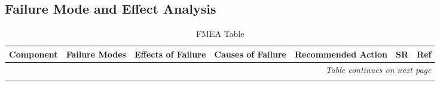 \documentclass{article}
\begin{document}
\begin{landscape}

    \section{Failure Mode and Effect Analysis}
    \centering
    \renewcommand{\arraystretch}{1.5}
    \setlength\LTleft{0pt}
    \setlength\LTright{0pt}
    \begin{longtable}{|p{0.6cm}|p{4cm}p{4cm}p{4cm}p{4cm}p{1.5cm}p{1.5cm}|}
    \caption{FMEA Table}\\\hline
    \toprule \multicolumn{1}{|c}{\textbf{Component}} & \multicolumn{1}{c}{\textbf{Failure Modes}} & \multicolumn{1}{c}{\textbf{Effects of Failure}} & \multicolumn{1}{c}{\textbf{Causes of Failure}} & \multicolumn{1}{c}{\textbf{Recommended Action}} & \multicolumn{1}{c}{\textbf{SR}} & \multicolumn{1}{c|}{\textbf{Ref}}\\\hline
    \endhead
    \hline
    \multicolumn{7}{|r|}{\textit{Table continues on next page}}\\
    \bottomrule
    \endfoot
    \bottomrule
    \endlastfoot
    

\end{longtable}
\end{landscape}
\end{document}
